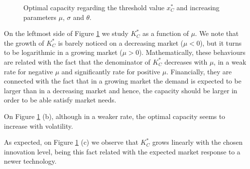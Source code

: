 \begin{figure}[!htb]
	\begin{subfigmatrix}{3}
	\end{subfigmatrix}
	\caption{Optimal capacity regarding the threshold value $x^*_C$ and increasing parameters $\mu$, $\sigma$ and $\theta$.}
	\label{fig:k1}
\end{figure}

On the leftmost side of Figure \ref{fig:k1} we study $K^*_C$ as a function of $\mu$. We note that the growth of $K^*_C$ is barely noticed on a decreasing market ($\mu<0$), but it turns to be logarithmic in a growing market ($\mu>0$). Mathematically, these behaviours are related with the fact that the denominator of $K^*_C$ decreases with $\mu$, in a weak rate for negative $\mu$ and significantly rate for positive $\mu$. Financially, they are connected with the fact that in a growing market the demand is expected to be larger than in a decreasing market and hence, the capacity should be larger in order to be able satisfy market needs.

On Figure \ref{fig:k1} (b), although in a weaker rate, the optimal capacity seems to increase with volatility.

As expected, on Figure \ref{fig:k1} (c) we observe that $K^*_C$ grows linearly with the chosen innovation level, being this fact related with the expected market response to a newer technology.

